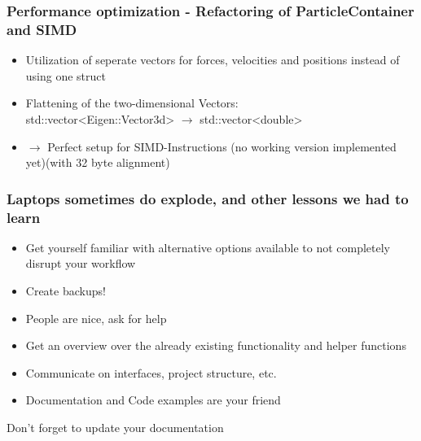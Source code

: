 \begin{frame}
	\frametitle{Performance optimization - Refactoring of ParticleContainer and SIMD}
	\large
	\vspace{1cm}
	\begin{itemize}
	\item<1-> Utilization of seperate vectors for forces, velocities and positions instead of using one struct
	\item<2-> Flattening of the two-dimensional Vectors: \\
	std::vector<Eigen::Vector3d> $\rightarrow$ std::vector<double> \\
	\item<3->[]\Large $\longrightarrow$ Perfect setup for SIMD-Instructions (no working version implemented yet)(with 32 byte alignment)
	
	\end{itemize}
	
\end{frame}

\begin{frame}
	\frametitle{Laptops sometimes do explode, and other lessons we had to learn}
	\large
	\begin{itemize}
	\item<1-> Get yourself familiar with alternative options available to not completely disrupt your workflow
	\item<2-> Create backups!
	\item<3-> People are nice, ask for help
	\item<4->  Get an overview over the already existing functionality and helper functions
	\item<5->  Communicate on interfaces, project structure, etc.
	\item<6-> Documentation and Code examples are your friend
	\end{itemize}
	\item<7-> Don't forget to update your documentation
	
\end{frame}




